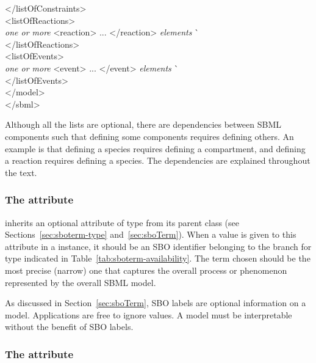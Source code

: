 \begin{tt}
\begin{tabbing}
\>\></listOfConstraints>\\
\>\><listOfReactions>\\
\>\>\>\textrm{\emph{one or more}} <reaction> ... </reaction> \textrm{\emph{elements}}  \` \sayOptional\\
\>\></listOfReactions>\\
\>\><listOfEvents>\\
\>\>\>\textrm{\emph{one or more}} <event> ... </event> \textrm{\emph{elements}}  \` \sayOptional\\
\>\></listOfEvents>\\
\></model>\\
</sbml>
\end{tabbing}
\regularspacing
\end{tt}
\vspace*{2ex}

Although all the lists are optional, there are dependencies
between SBML components such that defining some components
requires defining others.  An example is that defining a species
requires defining a compartment, and defining a reaction requires
defining a species.  The dependencies are explained throughout the
text.
  

\subsubsection{The  attribute}
\label{sec:model-sboterm}

\Model inherits an optional 
attribute of type  from its parent
class \SBase (see Sections~\ref{sec:sboterm-type}
and~\ref{sec:sboTerm}).  When a value is given to this
attribute in a \Model instance, it should be an
SBO identifier belonging to the branch for type \Model 
indicated in Table~\ref{tab:sboterm-availability}. 
The term chosen should be the most precise (narrow)
one that captures the overall process or phenomenon represented
by the overall SBML model.

As discussed in Section~\ref{sec:sboTerm}, SBO labels are optional
information on a model.  Applications are free to ignore
 values.  A model must be interpretable without the
benefit of SBO labels.


\subsubsection{The  attribute}
\label{sec:model-substanceUnits}

